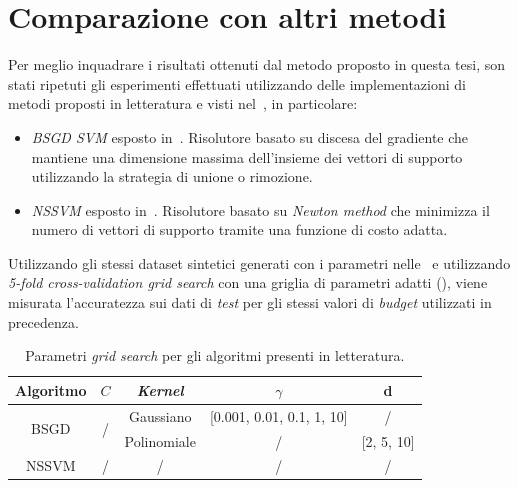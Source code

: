 \section{Comparazione con altri metodi}\label{sec:comparazione_metodi}
Per meglio inquadrare i risultati ottenuti dal metodo proposto in questa tesi, son stati ripetuti gli esperimenti effettuati utilizzando delle implementazioni di metodi proposti in letteratura e visti nel~, in particolare:
\begin{itemize}
    \item \emph{BSGD SVM} esposto in~\cite{2012_bsgd}. Risolutore basato su discesa del gradiente che mantiene una dimensione massima dell'insieme dei vettori di supporto utilizzando la strategia di unione o rimozione.
    \item \emph{NSSVM} esposto in~\cite{2020_sparse_svm}. Risolutore basato su \emph{Newton method} che minimizza il numero di vettori di supporto tramite una funzione di costo adatta.
\end{itemize}
Utilizzando gli stessi dataset sintetici generati con i parametri nelle~ e utilizzando \emph{5-fold cross-validation grid search} con una griglia di parametri adatti (), viene misurata l'accuratezza sui dati di \emph{test} per gli stessi valori di \emph{budget} utilizzati in precedenza.
\begin{table}
    \centering
    \begin{tabular}{ccccc}
        \toprule
        Algoritmo & $C$ & \emph{Kernel} & $\gamma$ & d \\
        \midrule
        \multirow{2}{*}{BSGD}   & \multirow{2}{*}{/}  & Gaussiano   & [0.001, 0.01, 0.1, 1, 10]   & /\\
                                      \cline{3-5}
                                &   & Polinomiale & / & [2, 5, 10] \\
        \hline
        NSSVM   & / & / & / & / \\
        \bottomrule
    \end{tabular}
    \caption{Parametri \emph{grid search} per gli algoritmi presenti in letteratura.}
    \label{tab:gridsearch_comparazioni}
\end{table}
